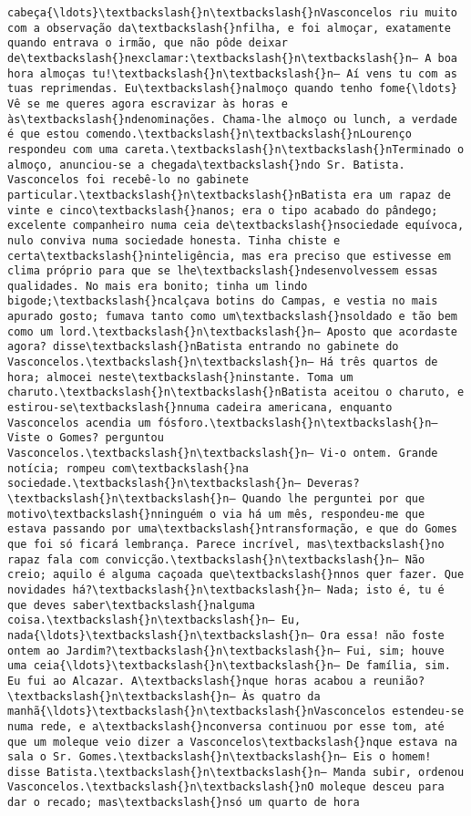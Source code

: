 \begin{Verbatim}[commandchars=\\\{\}]
cabeça{\ldots}\textbackslash{}n\textbackslash{}nVasconcelos riu muito com a observação da\textbackslash{}nfilha, e foi almoçar, exatamente quando entrava o irmão, que não pôde deixar de\textbackslash{}nexclamar:\textbackslash{}n\textbackslash{}n— A boa hora almoças tu!\textbackslash{}n\textbackslash{}n— Aí vens tu com as tuas reprimendas. Eu\textbackslash{}nalmoço quando tenho fome{\ldots} Vê se me queres agora escravizar às horas e às\textbackslash{}ndenominações. Chama-lhe almoço ou lunch, a verdade é que estou comendo.\textbackslash{}n\textbackslash{}nLourenço respondeu com uma careta.\textbackslash{}n\textbackslash{}nTerminado o almoço, anunciou-se a chegada\textbackslash{}ndo Sr. Batista. Vasconcelos foi recebê-lo no gabinete particular.\textbackslash{}n\textbackslash{}nBatista era um rapaz de vinte e cinco\textbackslash{}nanos; era o tipo acabado do pândego; excelente companheiro numa ceia de\textbackslash{}nsociedade equívoca, nulo conviva numa sociedade honesta. Tinha chiste e certa\textbackslash{}ninteligência, mas era preciso que estivesse em clima próprio para que se lhe\textbackslash{}ndesenvolvessem essas qualidades. No mais era bonito; tinha um lindo bigode;\textbackslash{}ncalçava botins do Campas, e vestia no mais apurado gosto; fumava tanto como um\textbackslash{}nsoldado e tão bem como um lord.\textbackslash{}n\textbackslash{}n— Aposto que acordaste agora? disse\textbackslash{}nBatista entrando no gabinete do Vasconcelos.\textbackslash{}n\textbackslash{}n— Há três quartos de hora; almocei neste\textbackslash{}ninstante. Toma um charuto.\textbackslash{}n\textbackslash{}nBatista aceitou o charuto, e estirou-se\textbackslash{}nnuma cadeira americana, enquanto Vasconcelos acendia um fósforo.\textbackslash{}n\textbackslash{}n— Viste o Gomes? perguntou Vasconcelos.\textbackslash{}n\textbackslash{}n— Vi-o ontem. Grande notícia; rompeu com\textbackslash{}na sociedade.\textbackslash{}n\textbackslash{}n— Deveras?\textbackslash{}n\textbackslash{}n— Quando lhe perguntei por que motivo\textbackslash{}nninguém o via há um mês, respondeu-me que estava passando por uma\textbackslash{}ntransformação, e que do Gomes que foi só ficará lembrança. Parece incrível, mas\textbackslash{}no rapaz fala com convicção.\textbackslash{}n\textbackslash{}n— Não creio; aquilo é alguma caçoada que\textbackslash{}nnos quer fazer. Que novidades há?\textbackslash{}n\textbackslash{}n— Nada; isto é, tu é que deves saber\textbackslash{}nalguma coisa.\textbackslash{}n\textbackslash{}n— Eu, nada{\ldots}\textbackslash{}n\textbackslash{}n— Ora essa! não foste ontem ao Jardim?\textbackslash{}n\textbackslash{}n— Fui, sim; houve uma ceia{\ldots}\textbackslash{}n\textbackslash{}n— De família, sim. Eu fui ao Alcazar. A\textbackslash{}nque horas acabou a reunião?\textbackslash{}n\textbackslash{}n— Às quatro da manhã{\ldots}\textbackslash{}n\textbackslash{}nVasconcelos estendeu-se numa rede, e a\textbackslash{}nconversa continuou por esse tom, até que um moleque veio dizer a Vasconcelos\textbackslash{}nque estava na sala o Sr. Gomes.\textbackslash{}n\textbackslash{}n— Eis o homem! disse Batista.\textbackslash{}n\textbackslash{}n— Manda subir, ordenou Vasconcelos.\textbackslash{}n\textbackslash{}nO moleque desceu para dar o recado; mas\textbackslash{}nsó um quarto de hora 
\end{Verbatim}
